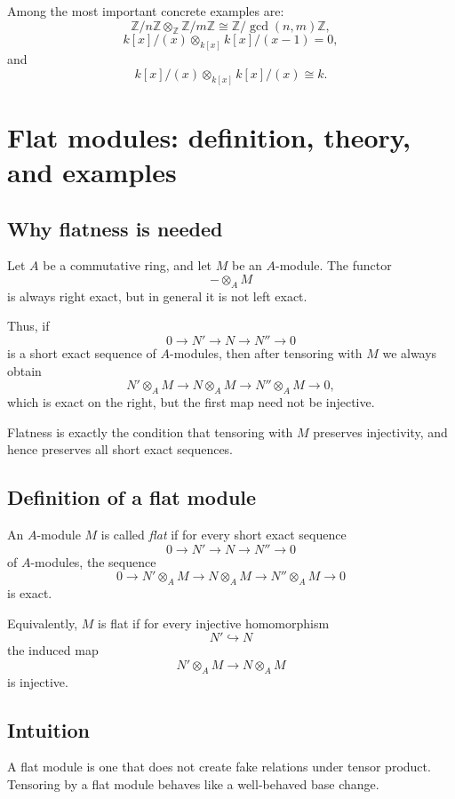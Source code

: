 \documentclass[12pt,a4paper]{article}
\theoremstyle{notespace}
\begin{document}
Among the most important concrete examples are:
\[
\mathbb Z/n\mathbb Z\otimes_{\mathbb Z}\mathbb Z/m\mathbb Z
\cong
\mathbb Z/\gcd(n,m)\mathbb Z,
\]
\[
k[x]/(x)\otimes_{k[x]} k[x]/(x-1)=0,
\]
and
\[
k[x]/(x)\otimes_{k[x]} k[x]/(x)\cong k.
\]

\section{Flat modules: definition, theory, and examples}

\subsection{Why flatness is needed}

Let \(A\) be a commutative ring, and let \(M\) be an \(A\)-module. The functor
\[
-\otimes_A M
\]
is always right exact, but in general it is not left exact.

Thus, if
\[
0\longrightarrow N' \longrightarrow N \longrightarrow N'' \longrightarrow 0
\]
is a short exact sequence of \(A\)-modules, then after tensoring with \(M\) we always obtain
\[
N'\otimes_A M \longrightarrow N\otimes_A M \longrightarrow N''\otimes_A M \longrightarrow 0,
\]
which is exact on the right, but the first map need not be injective.

Flatness is exactly the condition that tensoring with \(M\) preserves injectivity, and hence preserves all short exact sequences.

\subsection{Definition of a flat module}

An \(A\)-module \(M\) is called \emph{flat} if for every short exact sequence
\[
0\longrightarrow N' \longrightarrow N \longrightarrow N'' \longrightarrow 0
\]
of \(A\)-modules, the sequence
\[
0\longrightarrow N'\otimes_A M \longrightarrow N\otimes_A M \longrightarrow N''\otimes_A M \longrightarrow 0
\]
is exact.

Equivalently, \(M\) is flat if for every injective homomorphism
\[
N'\hookrightarrow N
\]
the induced map
\[
N'\otimes_A M \longrightarrow N\otimes_A M
\]
is injective.

\subsection{Intuition}

A flat module is one that does not create fake relations under tensor product. Tensoring by a flat module behaves like a well-behaved base change.
\end{document}
